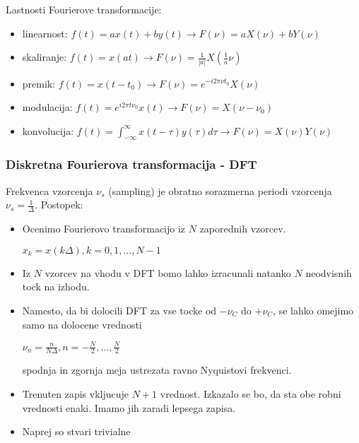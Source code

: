 \documentclass{article}
\begin{document}
\begin{multicols}{2}
	Lastnosti Fourierove transformacije:
	\begin{itemize}
		\item linearnost: $f(t) = ax(t) + by(t) \rightarrow F(\nu) = a X(\nu) + bY(\nu)$
		\item skaliranje: $f(t) = x(at) \rightarrow F(\nu) = \frac{1}{|a|} X(\frac{1}{a} \nu)$
		\item premik: $f(t) = x(t - t_0) \rightarrow F(\nu) = e^{-i2\pi \nu t_0} X(\nu)$
		\item modulacija: $f(t) = e^{i 2 \pi t \nu_0} x(t) \rightarrow F(\nu) = X(\nu - \nu_0)$
		\item konvolucija: $f(t) = \int_{- \infty}^{\infty} x(t - \tau)y(\tau) d\tau \rightarrow F(\nu) = X(\nu) Y(\nu)$
	\end{itemize}

	\subsubsection{Diskretna Fourierova transformacija - DFT}
	Frekvenca vzorcenja $\nu_s $ (sampling) je obratno sorazmerna periodi vzorcenja $\nu_s = \frac{1}{\Delta}$.
	Postopek:
	\begin{itemize}
		\item Ocenimo Fourierovo transformacijo iz $N$ zaporednih vzorcev.
		      \begin{center}
			      \begin{math}
				      x_k = x(k \Delta), k = 0,1, \dots, N - 1
			      \end{math}
		      \end{center}
		\item Iz $N$ vzorcev na vhodu v DFT bomo lahko izracunali natanko $N$ neodvisnih tock na izhodu.
		\item Namesto, da bi dolocili DFT za vse tocke od $- \nu_C$ do $+ \nu_C$, se lahko omejimo samo
		      na dolocene vrednosti
		      \begin{center}
			      \begin{math}
				      \nu_n = \frac{n}{N \Delta}, n = - \frac{N}{2}, \dots, \frac{N}{2}
			      \end{math}
		      \end{center}
		      spodnja in zgornja meja ustrezata ravno Nyquistovi frekvenci.
		\item Trenuten zapis vkljucuje $N + 1$ vrednost. Izkazalo se bo, da sta obe robni vrednosti enaki. Imamo
		      jih zaradi lepsega zapisa.
		\item Naprej so stvari trivialne

\end{itemize}
\end{multicols}
\end{document}
